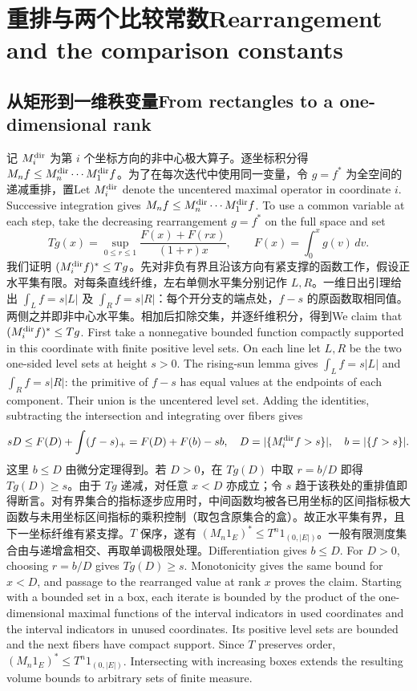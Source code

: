\documentclass[UTF8,fontset=fandol,11pt]{ctexart}
\newcommand{\bi}[2]{\ifdefined\ResearchPaperChinese #1\else #2\fi}
\begin{document}
\section{\bi{重排与两个比较常数}{Rearrangement and the comparison constants}}
\subsection{\bi{从矩形到一维秩变量}{From rectangles to a one-dimensional rank}}
\bi{记 $M_i^{\rm dir}$ 为第 $i$ 个坐标方向的非中心极大算子。逐坐标积分得 $M_n f\le M_n^{\rm dir}\cdots M_1^{\rm dir} f$。为了在每次迭代中使用同一变量，令 $g=f^*$ 为全空间的递减重排，置}{Let $M_i^{\rm dir}$ denote the uncentered maximal operator in coordinate $i$. Successive integration gives $M_n f\le M_n^{\rm dir}\cdots M_1^{\rm dir} f$. To use a common variable at each step, take the decreasing rearrangement $g=f^*$ on the full space and set}
\[
 Tg(x)=\sup_{0\le r\le1}\frac{F(x)+F(rx)}{(1+r)x},\qquad
 F(x)=\int_0^x g(v)\,dv .
\]
\bi{我们证明 $(M_i^{\rm dir} f)^*\le Tg$。先对非负有界且沿该方向有紧支撑的函数工作，假设正水平集有限。对每条直线纤维，左右单侧水平集分别记作 $L,R$。一维日出引理给出 $\int_L f=s|L|$ 及 $\int_R f=s|R|$：每个开分支的端点处，$f-s$ 的原函数取相同值。两侧之并即非中心水平集。相加后扣除交集，并逐纤维积分，得到}{We claim that $(M_i^{\rm dir}f)^*\le Tg$. First take a nonnegative bounded function compactly supported in this coordinate with finite positive level sets. On each line let $L,R$ be the two one-sided level sets at height $s>0$. The rising-sun lemma gives $\int_L f=s|L|$ and $\int_R f=s|R|$: the primitive of $f-s$ has equal values at the endpoints of each component. Their union is the uncentered level set. Adding the identities, subtracting the intersection and integrating over fibers gives}
\[
 sD\le F(D)+\int(f-s)_+=F(D)+F(b)-sb,\quad
 D=|\{M_i^{\rm dir}f>s\}|,\quad b=|\{f>s\}|.
\]
\bi{这里 $b\le D$ 由微分定理得到。若 $D>0$，在 $Tg(D)$ 中取 $r=b/D$ 即得 $Tg(D)\ge s$。由于 $Tg$ 递减，对任意 $x<D$ 亦成立；令 $s$ 趋于该秩处的重排值即得断言。对有界集合的指标逐步应用时，中间函数均被各已用坐标的区间指标极大函数与未用坐标区间指标的乘积控制（取包含原集合的盒）。故正水平集有界，且下一坐标纤维有紧支撑。$T$ 保序，遂有 $(M_n1_E)^*\le T^n1_{(0,|E|)}$。一般有限测度集合由与递增盒相交、再取单调极限处理。}{Differentiation gives $b\le D$. For $D>0$, choosing $r=b/D$ gives $Tg(D)\ge s$. Monotonicity gives the same bound for $x<D$, and passage to the rearranged value at rank $x$ proves the claim. Starting with a bounded set in a box, each iterate is bounded by the product of the one-dimensional maximal functions of the interval indicators in used coordinates and the interval indicators in unused coordinates. Its positive level sets are bounded and the next fibers have compact support. Since $T$ preserves order, $(M_n1_E)^*\le T^n1_{(0,|E|)}$. Intersecting with increasing boxes extends the resulting volume bounds to arbitrary sets of finite measure.}
\end{document}
